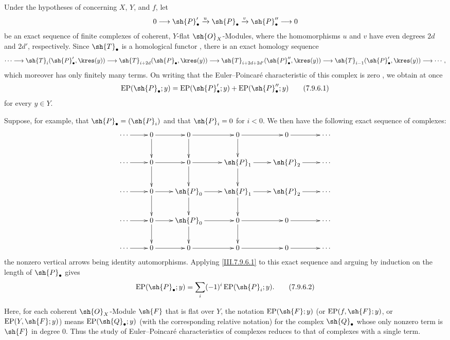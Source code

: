 \begin{env}[7.9.6]
\label{III.7.9.6}
Under the hypotheses of  concerning
$X$, $Y$, and $f$, let
\[
  0\longrightarrow\sh{P}'_\bullet
    \xrightarrow{u}\sh{P}_\bullet
    \xrightarrow{v}\sh{P}''_\bullet
    \longrightarrow 0
\]
be an exact sequence of finite complexes of coherent,
$Y$-flat $\sh{O}_X$-Modules, where the homomorphisms $u$
and $v$ have even degrees $2d$ and $2d'$, respectively.
Since $\sh{T}_\bullet$ is a homological functor
, there is an exact homology sequence
\[
  \cdots\longrightarrow
  \sh{T}_i(\sh{P}'_\bullet,\kres(y))
  \longrightarrow
  \sh{T}_{i+2d}(\sh{P}_\bullet,\kres(y))
  \longrightarrow
  \sh{T}_{i+2d+2d'}(\sh{P}''_\bullet,\kres(y))
  \longrightarrow
  \sh{T}_{i-1}(\sh{P}'_\bullet,\kres(y))
  \longrightarrow\cdots ,
\]
which moreover has only finitely many terms.  On writing
that the Euler--Poincar\'e characteristic of this complex is
zero , we obtain at once
\[
  \operatorname{EP}(\sh{P}_\bullet;y)
  =
  \operatorname{EP}(\sh{P}'_\bullet;y)
  +
  \operatorname{EP}(\sh{P}''_\bullet;y)
  \tag{7.9.6.1}\label{III.7.9.6.1}
\]
for every $y\in Y$.

Suppose, for example, that
$\sh{P}_\bullet=(\sh{P}_i)$ and that $\sh{P}_i=0$ for
$i<0$.  We then have the following exact sequence of
complexes:
\[
\xymatrix@C=2.4em{
  \cdots \ar[r] & 0 \ar[r]\ar[d] & 0 \ar[r]\ar[d]
    & 0 \ar[r]\ar[d] & 0 \ar[r] & \cdots \\
  \cdots \ar[r] & 0 \ar[r]\ar[d] & 0 \ar[r]\ar[d]
    & \sh{P}_1 \ar[r]\ar[d] & \sh{P}_2 \ar[r] & \cdots \\
  \cdots \ar[r] & 0 \ar[r]\ar[d] & \sh{P}_0 \ar[r]\ar[d]
    & \sh{P}_1 \ar[r]\ar[d] & \sh{P}_2 \ar[r] & \cdots \\
  \cdots \ar[r] & 0 \ar[r]\ar[d] & \sh{P}_0 \ar[r]\ar[d]
    & 0 \ar[r]\ar[d] & 0 \ar[r] & \cdots \\
  \cdots \ar[r] & 0 \ar[r] & 0 \ar[r]
    & 0 \ar[r] & 0 \ar[r] & \cdots
}
\]
the nonzero vertical arrows being identity automorphisms.
Applying \eqref{III.7.9.6.1} to this exact sequence and
arguing by induction on the length of $\sh{P}_\bullet$
gives
\[
  \operatorname{EP}(\sh{P}_\bullet;y)
  =
  \sum_i(-1)^i\operatorname{EP}(\sh{P}_i;y).
  \tag{7.9.6.2}\label{III.7.9.6.2}
\]

Here, for each coherent $\sh{O}_X$-Module $\sh{F}$ that is
flat over $Y$, the notation
$\operatorname{EP}(\sh{F};y)$ (or
$\operatorname{EP}(f,\sh{F};y)$, or
$\operatorname{EP}(Y,\sh{F};y)$) means
$\operatorname{EP}(\sh{Q}_\bullet;y)$ (with the
corresponding relative notation) for the complex
$\sh{Q}_\bullet$ whose only nonzero term is $\sh{F}$ in
degree $0$.  Thus the study of Euler--Poincar\'e
characteristics of complexes reduces to that of complexes
with a single term.
\end{env}


